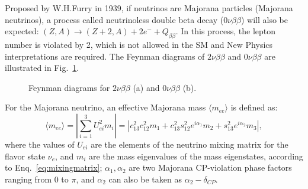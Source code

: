 Proposed by W.H.Furry in 1939\cite{furry1939transition}, if neutrinos are Majorana particles (Majorana neutrinos), a process called neutrinoless double beta decay ($0\nu\beta\beta$) will also be expected: $(Z,A) \to (Z+2,A)+2e^{-}+Q_{\beta\beta}$. In this process, the lepton number is violated by 2, which is not allowed in the SM and New Physics interpretations are required. The Feynman diagrams of $2\nu\beta\beta$ and $0\nu\beta\beta$ are illustrated in Fig.~\ref{fig:feynman}.
\begin{figure}[htbp]
	\centering
	{
		\caption[Feynman diagrams for $2\nu\beta\beta$ and $0\nu\beta\beta$.]{Feynman diagrams for $2\nu\beta\beta$ (a) and $0\nu\beta\beta$ (b).		\label{fig:feynman}}
	}
\end{figure}

For the Majorana neutrino, an effective Majorana mass $\langle m_{ee}\rangle$ is defined as\cite{suekane2015neutrino,zuber2020neutrino}:
\begin{equation}\label{eq:effective_nuMass}
\langle m_{ee}\rangle = |\sum_{i=1}^3 U^2_{ei}m_i|= |c^2_{13}c^2_{12}m_1+c^2_{13}s^2_{12}e^{i\alpha_1}m_2+s^2_{13}e^{i\alpha_2}m_3|,
\end{equation}
where the values of $U_{ei}$ are the elements of the neutrino mixing matrix for the flavor state $\nu_e$, and $m_i$ are the mass eigenvalues of the mass eigenstates, according to Enq.~\ref{eq:mixingmatrix}; $\alpha_1,\alpha_2$ are two Majorana CP-violation phase factors ranging from 0 to $\pi$, and $\alpha_2$ can also be taken as $\alpha_2-\delta_{CP}$.

